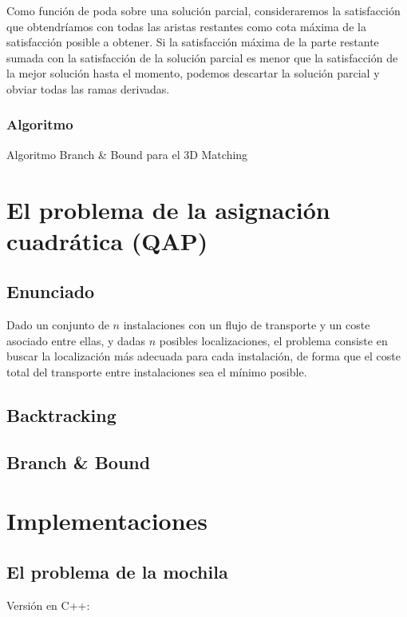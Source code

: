 \documentclass[a4paper, 11pt]{article} %
\begin{document}
    Como función de poda sobre una solución parcial, consideraremos la satisfacción que obtendríamos con todas las aristas restantes como cota máxima de la satisfacción posible a obtener. Si la satisfacción máxima de la parte restante sumada con la satisfacción de la solución parcial es menor que la satisfacción de la mejor solución hasta el momento, podemos descartar la solución parcial y obviar todas las ramas derivadas. 
    
  \subsubsection{Algoritmo}
    \begin{algorithm}[H]
    	\begin{algorithmic}[1]
		\REQUIRE 
    	\end{algorithmic}
        \caption{Algoritmo Branch \& Bound para el 3D Matching}
        \label{BBound-3DMatch}
    \end{algorithm}
  

\section{El problema de la asignación cuadrática (QAP)}
  \subsection{Enunciado}
    Dado un conjunto de $n$ instalaciones con un flujo de transporte y un coste asociado entre ellas, y dadas $n$ posibles 
    localizaciones, el problema consiste en buscar la localización más adecuada para cada instalación, de forma que el 
    coste total del transporte entre instalaciones sea el mínimo posible. 

  \subsection{Backtracking}
  \subsection{Branch \& Bound}


\section{Implementaciones}
  \subsection{El problema de la mochila}
        Versión en C++:
        
\end{document}

